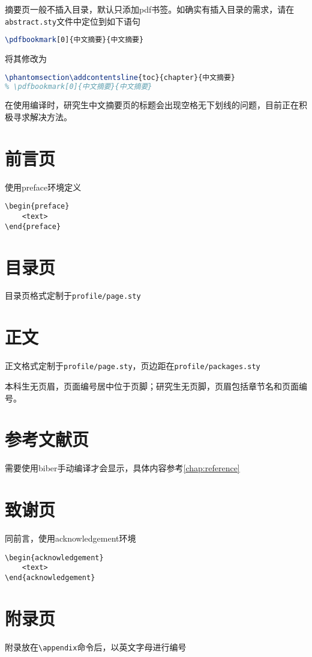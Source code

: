 摘要页一般不插入目录，默认只添加pdf书签。如确实有插入目录的需求，请在\texttt{abstract.sty}文件中定位到如下语句
\begin{lstlisting}[language=TeX]
% \phantomsection\addcontentsline{toc}{chapter}{中文摘要}
\pdfbookmark[0]{中文摘要}{中文摘要}
\end{lstlisting}
将其修改为
\begin{lstlisting}[language=TeX]
\phantomsection\addcontentsline{toc}{chapter}{中文摘要}
% \pdfbookmark[0]{中文摘要}{中文摘要}
\end{lstlisting}

在使用编译时，研究生中文摘要页的标题会出现空格无下划线的问题，目前正在积极寻求解决方法。

\section{前言页}

使用preface环境定义

\begin{lstlisting}
\begin{preface}
    <text>
\end{preface}
\end{lstlisting}

\section{目录页}

目录页格式定制于\texttt{profile/page.sty}

\section{正文}

正文格式定制于\texttt{profile/page.sty}，页边距在\texttt{profile/packages.sty}

本科生无页眉，页面编号居中位于页脚；研究生无页脚，页眉包括章节名和页面编号。


\section{参考文献页}

需要使用biber手动编译才会显示，具体内容参考\cref{chap:reference}

\section{致谢页}

同前言，使用acknowledgement环境

\begin{lstlisting}
\begin{acknowledgement}
    <text>
\end{acknowledgement}
\end{lstlisting}

\section{附录页}

附录放在\lstinline|\appendix|命令后，以英文字母进行编号
